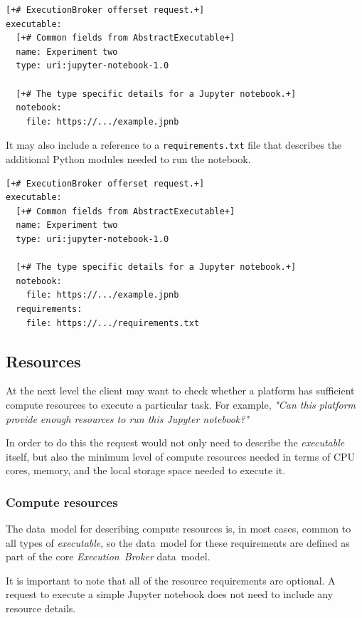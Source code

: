 \documentclass[11pt,a4paper]{ivoa}
\newcommand{\datamodel} {data~model}
\newcommand{\executionbroker} {\textit{Execution~Broker}}
\newcommand{\executable} {\textit{executable}}
\newcommand{\jupyternotebook} {Jupyter notebook}
\newcommand{\python} {Python}
\newcommand{\codeword}[1] {\texttt{#1}}
\newcommand{\cpu}[1] {CPU#1}
\begin{document}
\begin{lstlisting}[]
[+# ExecutionBroker offerset request.+]
executable:
  [+# Common fields from AbstractExecutable+]
  name: Experiment two
  type: uri:jupyter-notebook-1.0

  [+# The type specific details for a Jupyter notebook.+]
  notebook:
    file: https://.../example.jpnb
\end{lstlisting}

It may also include a reference to a \codeword{requirements.txt} file that describes the
additional \python{} modules needed to run the notebook.
\begin{lstlisting}[]
[+# ExecutionBroker offerset request.+]
executable:
  [+# Common fields from AbstractExecutable+]
  name: Experiment two
  type: uri:jupyter-notebook-1.0

  [+# The type specific details for a Jupyter notebook.+]
  notebook:
    file: https://.../example.jpnb
  requirements:
    file: https://.../requirements.txt
\end{lstlisting}

\subsection{Resources}
\label{sub-resources}

At the next level the client may want to check whether a platform has sufficient compute resources
to execute a particular task.
For example, \textit{"Can this platform provide enough resources to run this \jupyternotebook{}?"}

In order to do this the request would not only need to describe the \executable{} itself,
but also the minimum level of compute resources needed in terms of \cpu{} cores, memory,
and the local storage space needed to execute it.

\subsubsection{Compute resources}
\label{subsub-compute-resources}

The \datamodel{} for describing compute resources is, in most cases, common to all types of \executable{},
so the \datamodel{} for these requirements are defined as part of the core \executionbroker{} \datamodel{}.

It is important to note that all of the resource requirements are optional.
A request to execute a simple \jupyternotebook{} does not need to include any resource details.
\end{document}
